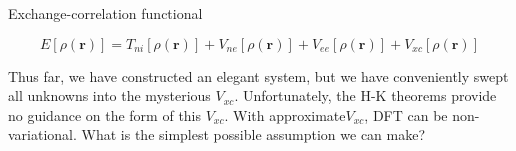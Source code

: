 \documentclass[aspectratio=169]{beamer}
\let \vec \mathbf
\begin{document}
    \begin{frame}{Exchange-correlation functional}

        \begin{equation*}
            E[\rho(\vec{r})] = T_{ni}[\rho(\vec{r})] + V_{ne}[\rho(\vec{r})] + V_{ee}[\rho(\vec{r})] + V_{xc}[\rho(\vec{r})]
        \end{equation*}

        Thus far, we have constructed an elegant system, but we have conveniently swept all unknowns into the mysterious $V_{xc}$. \newline
\newline 
Unfortunately, the H-K theorems provide no guidance on the form of this $V_{xc}$. With approximate$V_{xc}$, DFT can be non-variational.\newline
        \newline
        What is the simplest possible assumption we can make?
    \end{frame}
\end{document}
